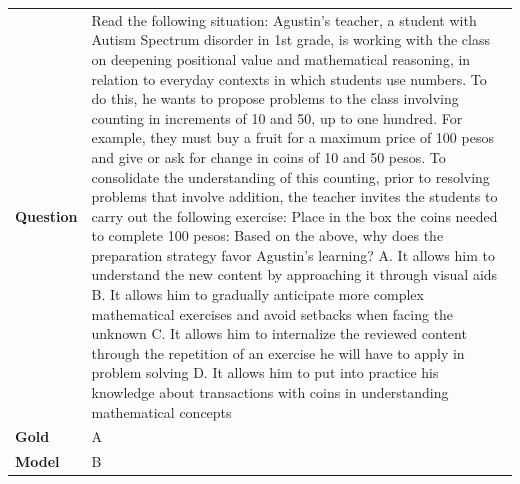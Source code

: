 \begin{longtable}{@{}l p{13cm}@{}}
  \textbf{Question}  & Read the following situation: Agustin's teacher, a student with Autism Spectrum disorder in 1st grade, is working with the class on deepening positional value and mathematical reasoning, in relation to everyday contexts in which students use numbers. To do this, he wants to propose problems to the class involving counting in increments of 10 and 50, up to one hundred. For example, they must buy a fruit for a maximum price of 100 pesos and give or ask for change in coins of 10 and 50 pesos. To consolidate the understanding of this counting, prior to resolving problems that involve addition, the teacher invites the students to carry out the following exercise: Place in the box the coins needed to complete 100 pesos: Based on the above, why does the preparation strategy favor Agustin's learning? \newline A. It allows him to understand the new content by approaching it through visual aids \newline B. It allows him to gradually anticipate more complex mathematical exercises and avoid setbacks when facing the unknown \newline C. It allows him to internalize the reviewed content through the repetition of an exercise he will have to apply in problem solving \newline D. It allows him to put into practice his knowledge about transactions with coins in understanding mathematical concepts   \\
  \textbf{Gold}      & A       \\
  \textbf{Model}     & B  \\

\end{longtable}
